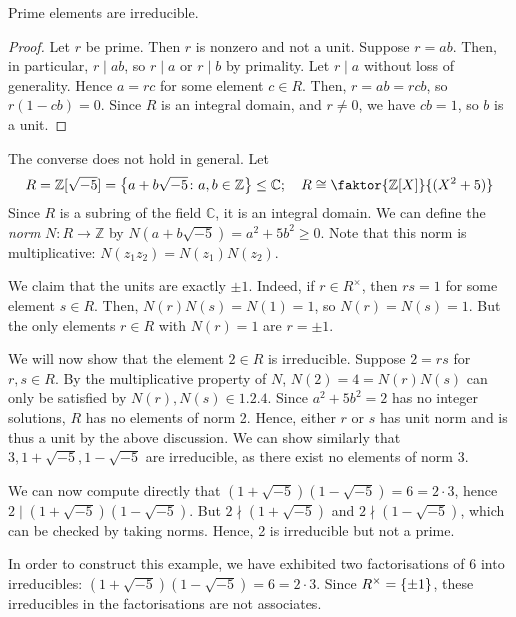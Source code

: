 \begin{lemma}
	Prime elements are irreducible.
\end{lemma}
\begin{proof}
	Let \( r \) be prime.
	Then \( r \) is nonzero and not a unit.
	Suppose \( r = ab \).
	Then, in particular, \( r \mid ab \), so \( r \mid a \) or \( r \mid b \) by primality.
	Let \( r \mid a \) without loss of generality.
	Hence \( a = rc \) for some element \( c \in R \).
	Then, \( r = ab = rcb \), so \( r(1-cb) = 0 \).
	Since \( R \) is an integral domain, and \( r \neq 0 \), we have \( cb = 1 \), so \( b \) is a unit.
\end{proof}
\begin{example}
	The converse does not hold in general.
	Let
	\[
		R = \mathbb Z[\sqrt{-5}] = \qty{a+b\sqrt{-5} \colon a,b \in \mathbb Z} \leq \mathbb C;\quad R \cong \faktor{\mathbb Z[X]}{(X^2 + 5)}
	\]
	Since \( R \) is a subring of the field \( \mathbb C \), it is an integral domain.
	We can define the \textit{norm} \( N \colon R \to \mathbb Z \) by \( N(a+b\sqrt{-5}) = a^2 + 5b^2 \geq 0 \).
	Note that this norm is multiplicative: \( N(z_1 z_2) = N(z_1) N(z_2) \).

	We claim that the units are exactly \( \pm 1 \).
	Indeed, if \( r \in R^\times \), then \( rs = 1 \) for some element \( s \in R \).
	Then, \( N(r) N(s) = N(1) = 1 \), so \( N(r) = N(s) = 1 \).
	But the only elements \( r \in R \) with \( N(r) = 1 \) are \( r = \pm 1 \).

	We will now show that the element \( 2 \in R \) is irreducible.
	Suppose \( 2 = rs \) for \( r,s \in R \).
	By the multiplicative property of \( N \), \( N(2) = 4 = N(r) N(s) \) can only be satisfied by \( N(r), N(s) \in \qty{1,2,4} \).
	Since \( a^2 + 5b^2 = 2 \) has no integer solutions, \( R \) has no elements of norm 2.
	Hence, either \( r \) or \( s \) has unit norm and is thus a unit by the above discussion.
	We can show similarly that \( 3, 1 + \sqrt{-5}, 1 - \sqrt{-5} \) are irreducible, as there exist no elements of norm 3.

	We can now compute directly that \( (1 + \sqrt{-5})(1-\sqrt{-5}) = 6 = 2 \cdot 3 \), hence \( 2 \mid (1 + \sqrt{-5})(1-\sqrt{-5}) \).
	But \( 2 \nmid (1 + \sqrt{-5}) \) and \( 2 \nmid (1 - \sqrt{-5}) \), which can be checked by taking norms.
	Hence, 2 is irreducible but not a prime.

	In order to construct this example, we have exhibited two factorisations of 6 into irreducibles: \( (1 + \sqrt{-5})(1-\sqrt{-5}) = 6 = 2 \cdot 3 \).
	Since \( R^\times = \qty{\pm 1} \), these irreducibles in the factorisations are not associates.
\end{example}

